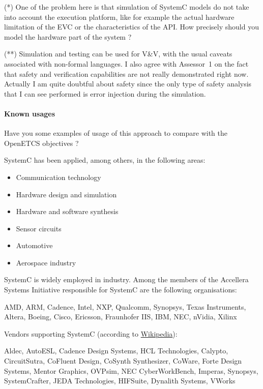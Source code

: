 \begin{assessor2}
  \begin{item}
  \item[(*)] One of the problem here is that simulation of SystemC
    models do not take into account the execution platform, like for
    example the actual hardware limitation of the EVC or the
    characteristics of the API. How precisely should you model the
    hardware part of the system ?
  \item[(**)] Simulation and testing can be used for V\&V, with the
    usual caveats associated with non-formal languages. I also agree
    with Assessor~1 on the fact that safety and verification
    capabilities are not really demonstrated right now. Actually I am
    quite doubtful about safety since the only type of safety analysis
    that I can see performed is error injection during the simulation.
  \end{item}
\end{assessor2}

\paragraph{Known usages} Have you some examples of usage of this approach to compare with the OpenETCS objectives ?

SystemC has been applied, among others, in the following areas:

\begin{itemize}
\item Communication technology
\item Hardware design and simulation
\item Hardware and software synthesis
\item Sensor circuits
\item Automotive
\item Aerospace industry
\end{itemize}

SystemC is widely employed in industry. Among the members of the Accellera Systems Initiative responsible for SystemC are the following organisations:

AMD, ARM, Cadence, Intel, NXP, Qualcomm, Synopsys, Texas Instruments, Altera, Boeing, Cisco, Ericsson, Fraunhofer IIS, IBM, NEC, nVidia, Xilinx

Vendors supporting SystemC (according to \href{http://en.wikipedia.org/wiki/SystemC}{Wikipedia}):

Aldec, AutoESL, Cadence Design Systems, HCL Technologies, Calypto, CircuitSutra, CoFluent Design, CoSynth Synthesizer, CoWare, Forte Design Systems, Mentor Graphics, OVPsim, NEC CyberWorkBench, Imperas, Synopsys, SystemCrafter, JEDA Technologies, HIFSuite, Dynalith Systems, VWorks


